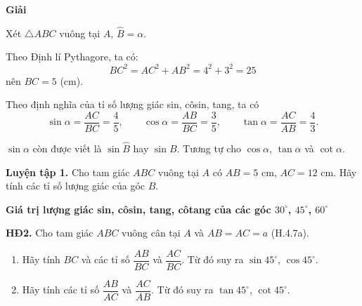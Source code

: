 \begin{lesson}
    \begin{center}
    \end{center}

    \textbf{Giải}

    Xét $\triangle ABC$ vuông tại $A$, $\widehat B=\alpha$.

    Theo Định lí Pythagore, ta có:
    \[
        BC^2=AC^2+AB^2=4^2+3^2=25
    \]
    nên $BC=5$ (cm).

    Theo định nghĩa của tỉ số lượng giác sin, côsin, tang, ta có
    \[
        \sin\alpha=\dfrac{AC}{BC}=\dfrac{4}{5},\qquad
        \cos\alpha=\dfrac{AB}{BC}=\dfrac{3}{5},\qquad
        \tan\alpha=\dfrac{AC}{AB}=\dfrac{4}{3}.
    \]

    $\sin\alpha$ còn được viết là $\sin\widehat B$ hay $\sin B$. Tương tự cho $\cos\alpha$, $\tan\alpha$ và $\cot\alpha$.

    \textbf{Luyện tập 1.} Cho tam giác $ABC$ vuông tại $A$ có $AB=5$ cm, $AC=12$ cm. Hãy tính các tỉ số lượng giác của góc $B$.

    \answerline
    \answerline

    \textbf{Giá trị lượng giác sin, côsin, tang, côtang của các góc $30^\circ$, $45^\circ$, $60^\circ$}

    \textbf{HĐ2.} Cho tam giác $ABC$ vuông cân tại $A$ và $AB=AC=a$ (H.4.7a).
    \begin{enumerate}[label=\alph*)]
        \item Hãy tính $BC$ và các tỉ số $\dfrac{AB}{BC}$ và $\dfrac{AC}{BC}$. Từ đó suy ra $\sin45^\circ$, $\cos45^\circ$.
        \item Hãy tính các tỉ số $\dfrac{AB}{AC}$ và $\dfrac{AC}{AB}$. Từ đó suy ra $\tan45^\circ$, $\cot45^\circ$.
    \end{enumerate}


\end{lesson}
